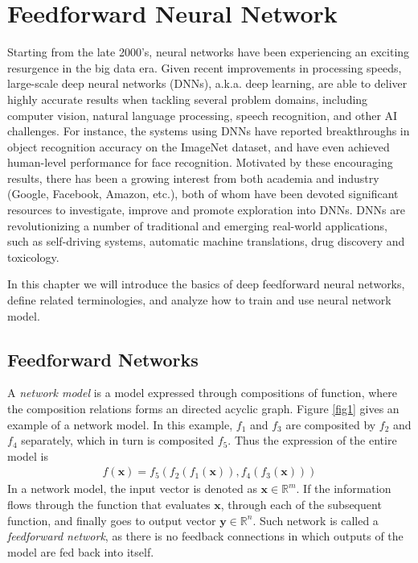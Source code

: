 \chapter{Feedforward Neural Network}

Starting from the late 2000's, neural networks have been experiencing an exciting resurgence in the big data era. Given recent improvements in processing speeds, large-scale deep neural networks (DNNs), a.k.a. deep learning, are able to deliver highly accurate results when tackling several problem domains, including computer vision, natural language processing, speech recognition, and other AI challenges. For instance, the systems using DNNs have reported breakthroughs in object recognition accuracy on the ImageNet dataset, and have even achieved human-level performance for face recognition. Motivated by these encouraging results, there has been a growing interest from both academia and industry (Google, Facebook, Amazon, etc.), both of whom have been devoted significant resources to investigate, improve and promote exploration into DNNs. DNNs are revolutionizing a number of traditional and emerging real-world applications, such as self-driving systems, automatic machine translations, drug discovery and toxicology.

In this chapter we will introduce the basics of deep feedforward neural networks, define related terminologies, and analyze how to train and use neural network model.
\section{Feedforward Networks}
A \textit{network model} is a model expressed through compositions of function, where the composition relations forms an directed acyclic graph. Figure \ref{fig1} gives an example of a network model. In this example, $f_1$ and $f_3$ are composited by $f_2$ and $f_4$ separately, which in turn is composited $f_5$. Thus the expression of the entire model is
\begin{align*}
\label{enetwork}
f(\bm{x}) = f_5(f_2(f_1(\bm{x})), f_4(f_3(\bm{x})))
\end{align*}
In a network model, the input vector is denoted as $\bm{x}\in\mathbb{R}^m$. If the information flows through the function that evaluates $\bm{x}$, through each of the subsequent function, and finally goes to output vector $\bm{y}\in\mathbb{R}^n$. Such network is called a \textit{feedforward network}, as there is no feedback connections in which outputs of the model are fed back into itself.

